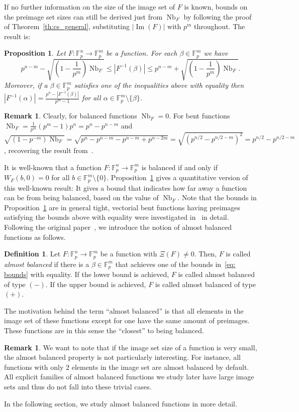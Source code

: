 \documentclass[11pt]{article}
\newcommand{\F}{\mathbb F}
\DeclareMathOperator{\Nb}{Nb}
\theoremstyle{plain}
\newtheorem{proposition}[theorem]{Proposition}
\theoremstyle{definition}
\newtheorem{definition}[theorem]{Definition}
\newtheorem{remark}[theorem]{Remark}
\numberwithin{theorem}{section}
\numberwithin{equation}{section}
\numberwithin{table}{section}
\numberwithin{figure}{section}
\DeclareMathOperator{\image}{Im}
\begin{document}
{If no further information on the size of the image set of $F$ is known, bounds on the preimage set sizes can still be derived just from $\Nb_F$ by following the proof of Theorem~\ref{th:cs_general}, substituting $|\image(F)|$ with $p^m$ throughout. The result is:
\begin{proposition} \label{prop:cs}
    Let $F \colon \F_{p}^n \rightarrow \F_{p}^m$ be a function. For each $\beta \in \F_p^m$ we have
    \[p^{n-m}-\sqrt{\left(1-\frac{1}{p^m}\right)\Nb_F} \leq |F^{-1}(\beta)| \leq p^{n-m}+\sqrt{\left(1-\frac{1}{p^m}\right)\Nb_F}.\]
    Moreover, if a $\beta \in \F_p^m$ satisfies one of the inequalities above with equality then $|F^{-1}(\alpha)|=\frac{p^n-|F^{-1}(\beta)|}{p^m-1}$ for all $\alpha \in \F_p^m\setminus \{\beta\}$.
\end{proposition}

\begin{remark}
    Clearly, for balanced functions $\Nb_F=0$. For bent functions $\Nb_F=\frac{1}{p^m}(p^m-1)p^n=p^n-p^{n-m}$ and $\sqrt{(1-p^{-m})\Nb_F} = \sqrt{p^n-p^{n-m}-p^{n-m}+p^{n-2m}}=\sqrt{(p^{n/2}-p^{n/2-m})^2}=p^{n/2}-p^{n/2-m}$, recovering the result from~\cite[Theorem 2.5.]{KoelschPolujan2024}.
\end{remark}

It is well-known that a function $F \colon \F_{p}^n \rightarrow \F_{p}^m$  is balanced if and only if $W_F(b,0)=0$ for all  $b \in \F_{p}^m \setminus \{0\}$. Proposition~\ref{prop:cs} gives a quantitative version of this well-known result: It gives a bound that indicates how far away a function can be from being balanced, based on the value of $\Nb_F$. Note that the bounds in Proposition~\ref{prop:cs} are in general tight, vectorial bent functions having preimages satisfying the bounds  above with equality were investigated in~\cite{KoelschPolujan2024} in detail. Following the original paper~\cite{KoelschPolujan2024}, we introduce the notion of almost balanced functions as follows.

\begin{definition}\label{def: AB}
    Let  $F \colon \F_{p}^n \rightarrow \F_{p}^m$ be a function with $\Xi(F)\neq 0$. Then, $F$ is called \textit{almost balanced} if there is a $\beta \in \F_p^m$ that achieves one of the bounds in~\eqref{eq: bounds} with equality. If the lower bound is achieved, $F$ is called almost balanced of type $(-)$. If the upper bound is achieved, $F$ is called almost balanced of type $(+)$.
\end{definition}
The motivation behind the term ``almost balanced'' is that all elements in the image set of these functions except for one have the same amount of preimages. These functions are in this sense the ``closest'' to being balanced.
 \begin{remark}
    We want to note that if the image set size of a function is very small, the almost balanced property is not particularly interesting. For instance, all functions with only $2$ elements in the image set are almost balanced by default. All explicit families of almost balanced functions we study later have large image sets and thus do not fall into these trivial cases.
\end{remark}
In the following section, we study almost balanced functions in more detail.

}
\end{document}
